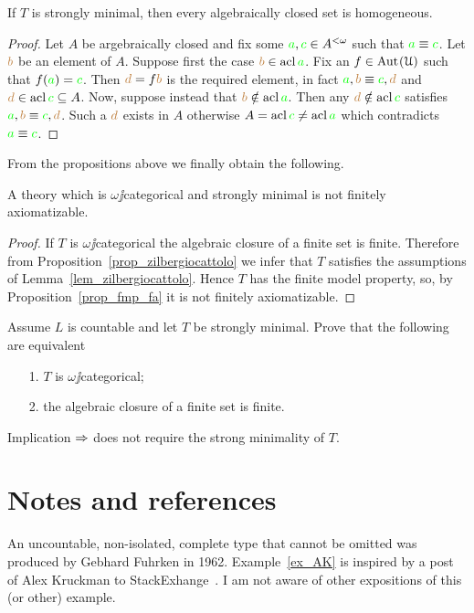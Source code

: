 \documentclass[creche.tex]{subfiles}
\begin{document}
\begin{proposition}\label{prop_zilbergiocattolo} If $T$ is strongly minimal, then every algebraically closed set is homogeneous.
\end{proposition}
\begin{proof}
Let $A$ be argebraically closed and fix some ${\color{green} a},{\color{green} c}\in A^{<\omega}$ such that ${\color{green} a}\equiv{\color{green}c}$.
Let ${\color{brown} b}$ be an element of $A$.
Suppose first the case ${\color{brown} b}\in\mathop{\rm acl}{\color{green} a}$.
Fix an $f\in\textrm{Aut\kern.15ex}(\EuScript U)$ such that $f({\color{green} a})={\color{green} c}$.
Then ${\color{brown} d}=f{\color{brown} b}$ is the required element, in fact ${\color{green} a},{\color{brown} b}\equiv {\color{green}c},{\color{brown} d}$ and ${\color{brown} d}\in\mathop{\rm acl}{\color{green} c}\subseteq  A$.
Now, suppose instead that ${\color{brown} b}\notin\mathop{\rm acl}{\color{green} a}$.
Then any ${\color{brown} d}\notin\mathop{\rm acl}{\color{green} c}$ satisfies ${\color{green} a},{\color{brown} b}\equiv {\color{green}c},{\color{brown} d}$.
Such a ${\color{brown} d}$ exists in $A$ otherwise $A=\mathop{\rm acl}{\color{green} c}\neq\mathop{\rm acl}{\color{green} a}$ which contradicts ${\color{green} a}\equiv {\color{green}c}$.
\end{proof}

From the propositions above we finally obtain the following.

\begin{theorem}\label{thm_zilbergiocattolo}
A theory which is $\omega\jj$categorical and strongly minimal is not finitely axiomatizable.
\end{theorem}

\begin{proof}
If $T$ is $\omega\jj$categorical the algebraic closure of a finite set is finite.
Therefore from Proposition~\ref{prop_zilbergiocattolo} we infer that $T$ satisfies the assumptions of Lemma~\ref{lem_zilbergiocattolo}.
Hence $T$ has the finite model property, so, by Proposition~\ref{prop_fmp_fa} it is not finitely axiomatizable.
\end{proof}


\begin{exercise} 
Assume $L$ is countable and let $T$ be strongly minimal.
Prove that the following are equivalent
\begin{itemize}
\item[1.] $T$ is $\omega\jj$categorical;
\item[2.] the algebraic closure of a finite set is finite.
\end{itemize}
Implication $\Rightarrow$ does not require the strong minimality of $T$.\QED
\end{exercise}




\section{Notes and references}
\label{Notes_countable}
An uncountable, non-isolated, complete type that cannot be omitted was produced by Gebhard Fuhrken in 1962.
Example~\ref{ex_AK} is inspired by a post of Alex Kruckman to StackExhange~\cite{AK}.
I am not aware of other expositions of this (or other) example.
\end{document}
